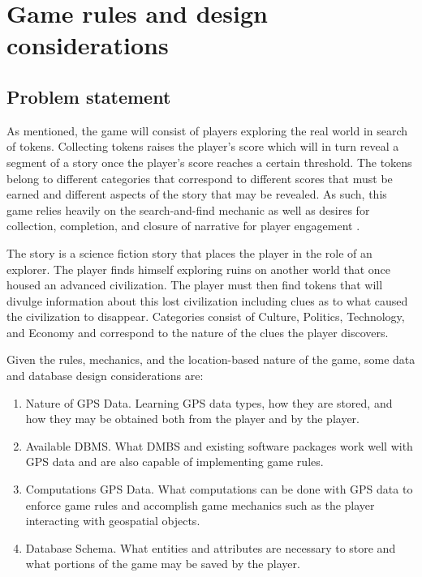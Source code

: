 \documentclass[conference]{IEEEtran}
\begin{document}
\section{Game rules and design considerations}
\subsection{Problem statement}
As mentioned, the game will consist of players exploring the real world in search of tokens. Collecting tokens raises the player’s score which will in turn reveal a segment of a story once the player’s score reaches a certain threshold. The tokens belong to different categories that correspond to different scores that must be earned and different aspects of the story that may be revealed. As such, this game relies heavily on the search-and-find mechanic as well as desires for collection, completion, and closure of narrative for player engagement \cite{game-methodology, location-based-games}. 

The story is a science fiction story that places the player in the role of an explorer. The player finds himself exploring ruins on another world that once housed an advanced civilization. The player must then find tokens that will divulge information about this lost civilization including clues as to what caused the civilization to disappear. Categories consist of Culture, Politics, Technology, and Economy and correspond to the nature of the clues the player discovers.

Given the rules, mechanics, and the location-based nature of the game, some data and database design considerations are:

\begin{enumerate}
	\item Nature of GPS Data. Learning GPS data types, how they are stored, and how they may be obtained both from the player and by the player.
	\item Available DBMS. What DMBS and existing software packages work well with GPS data and are also capable of implementing game rules.
	\item Computations GPS Data. What computations can be done with GPS data to enforce game rules and accomplish game mechanics such as the player interacting with geospatial objects.
	\item Database Schema. What entities and attributes are necessary to store and what portions of the game may be saved by the player.
\end{enumerate}
	
\end{document}
